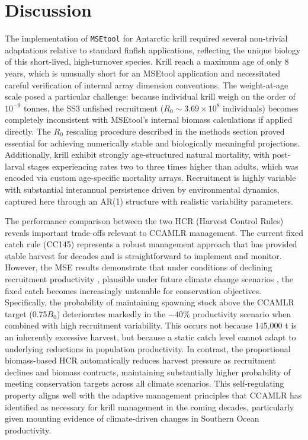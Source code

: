 \documentclass[
]{article}
\begin{document}
\pagebreak

\hypertarget{discussion}{%
\section{Discussion}\label{discussion}}

The implementation of \texttt{MSEtool} for Antarctic krill required several non-trivial adaptations relative to standard finfish applications, reflecting the unique biology of this short-lived, high-turnover species. Krill reach a maximum age of only 8 years, which is unusually short for an MSEtool application and necessitated careful verification of internal array dimension conventions. The weight-at-age scale posed a particular challenge: because individual krill weigh on the order of \(10^{-9}\) tonnes, the SS3 unfished recruitment (\(R_0 \sim 3.69 \times 10^8\) individuals) becomes completely inconsistent with MSEtool's internal biomass calculations if applied directly. The \(R_0\) rescaling procedure described in the methods section proved essential for achieving numerically stable and biologically meaningful projections. Additionally, krill exhibit strongly age-structured natural mortality, with post-larval stages experiencing rates two to three times higher than adults, which was encoded via custom age-specific mortality arrays. Recruitment is highly variable with substantial interannual persistence driven by environmental dynamics, captured here through an AR(1) structure with realistic variability parameters.

The performance comparison between the two HCR (Harvest Control Rules) reveals important trade-offs relevant to CCAMLR management. The current fixed catch rule (CC145) represents a robust management approach that has provided stable harvest for decades and is straightforward to implement and monitor. However, the MSE results demonstrate that under conditions of declining recruitment productivity , plausible under future climate change scenarios , the fixed catch becomes increasingly untenable for conservation objectives. Specifically, the probability of maintaining spawning stock above the CCAMLR target (0.75\(B_0\)) deteriorates markedly in the \(-40\%\) productivity scenario when combined with high recruitment variability. This occurs not because 145,000 t is an inherently excessive harvest, but because a static catch level cannot adapt to underlying reductions in population productivity. In contrast, the proportional biomass-based HCR automatically reduces harvest pressure as recruitment declines and biomass contracts, maintaining substantially higher probability of meeting conservation targets across all climate scenarios. This self-regulating property aligns well with the adaptive management principles that CCAMLR has identified as necessary for krill management in the coming decades, particularly given mounting evidence of climate-driven changes in Southern Ocean productivity.
\end{document}
